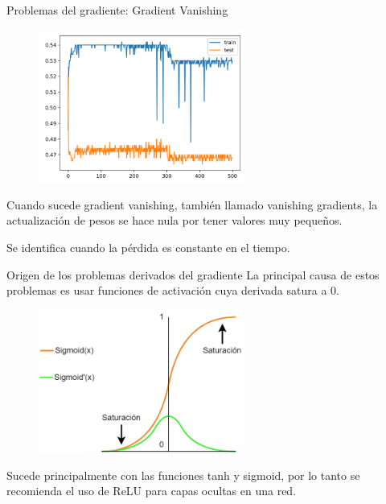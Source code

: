 \begin{frame}{Problemas del gradiente: Gradient Vanishing}
\begin{figure}
    \centering
    \includegraphics[width=0.6\textwidth]{Slides/figures/Tema 3/GradientVanishing.png}
    \caption{\cite{GradienVanishing}}
\end{figure}

Cuando sucede \alert{gradient vanishing}, también llamado \alert{vanishing gradients}, la actualización de pesos se hace \alert{nula} por tener valores \alert{muy pequeños}.

Se identifica cuando la pérdida es \alert{constante en el tiempo}.
\end{frame}

\begin{frame}{Origen de los problemas derivados del gradiente}
La principal \alert{causa} de estos problemas es usar \alert{funciones de activación} cuya derivada \alert{satura a 0}.

\begin{figure}
    \centering
    \includegraphics[width=0.6\textwidth]{Slides/figures/Tema 3/GradientCause.png}
\end{figure}

Sucede principalmente con las funciones \alert{tanh} y \alert{sigmoid}, por lo tanto se \alert{recomienda} el uso de ReLU para capas ocultas en una red.
\end{frame}

